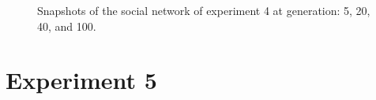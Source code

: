 \begin{figure}
    \hfill
    \caption{Snapshots of the social network of experiment 4 at generation:  5,  20,  40, and  100.}
    \label{fig:Appendix4}
\end{figure}

\clearpage
\section{Experiment 5}

